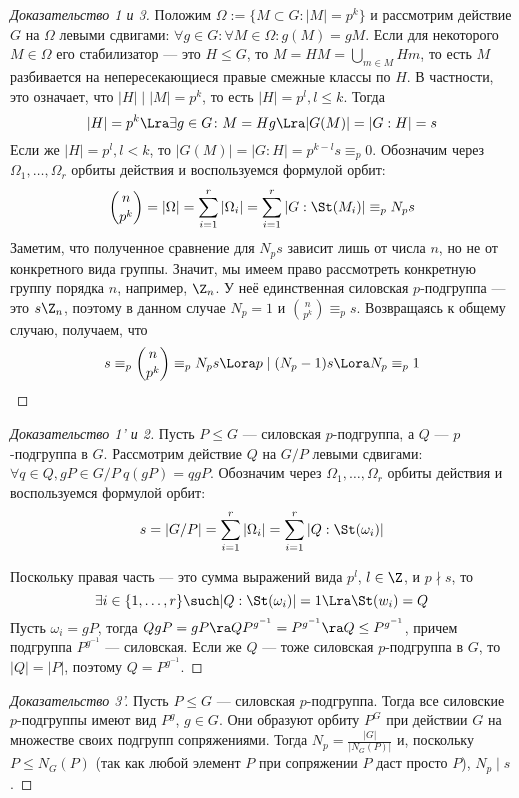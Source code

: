 \begin{proof}[Доказательство 1 и 3]
	Положим $\Omega := \{M  \subset G: |M| = p^k\}$ и рассмотрим действие $G$ на $\Omega$ левыми сдвигами: $\forall g \in G: \forall M \in \Omega: g(M) = gM$. Если для некоторого $M \in \Omega$ его стабилизатор --- это $H \le G$, то $M = HM = \bigcup_{m \in M}Hm$, то есть $M$ разбивается на непересекающиеся правые смежные классы по $H$. В частности, это означает, что $|H| \mid |M| = p^k$, то есть $|H| = p^l, l \le k$. Тогда 
	\[
		|H| = p^k \Lra \exists g \in G \colon M = Hg \Lra |G(M)| = |G : H| = s
	\]
	Если же $|H| = p^l, l < k$, то $|G(M)| = |G : H| = p^{k-l}s \equiv_p 0$. Обозначим через $\Omega_1, \ldots, \Omega_r$ орбиты действия и воспользуемся формулой орбит:
	\[
		\binom{n}{p^k} = |\Omega| = \sum\limits_{i = 1}^r|\Omega_i| = \sum\limits_{i = 1}^r|G : \St(M_i)| \equiv_p N_ps
	\]
	Заметим, что полученное сравнение для $N_ps$ зависит лишь от числа $n$, но не от конкретного вида группы. Значит, мы имеем право рассмотреть конкретную группу порядка $n$, например, $\Z_n$. У неё единственная силовская $p$-подгруппа --- это $s\Z_n$, поэтому в данном случае $N_p = 1$ и $\binom{n}{p^k} \equiv_p s$. Возвращаясь к общему случаю, получаем, что
	\[
		s \equiv_p \binom{n}{p^k} \equiv_p N_ps \Lora p \mid (N_p - 1)s \Lora N_p \equiv_p 1
	\]
\end{proof}

\begin{proof}[Доказательство 1' и 2]
	Пусть $P \le G$ --- силовская $p$-подгруппа, а $Q$ --- $p$-подгруппа в $G$. Рассмотрим действие $Q$ на $G / P$ левыми сдвигами: $\forall q \in Q, gP \in G / P\ q(gP) = qgP$. Обозначим через $\Omega_1, \ldots, \Omega_r$ орбиты действия и воспользуемся формулой орбит:
	\[s = |G / P| = \sum\limits_{i = 1}^r |\Omega_i| = \sum_{i = 1}^r |Q : \St(\omega_i)|\]
	
	Поскольку правая часть --- это сумма выражений вида $p^l$, $l \in \Z$, и $p \nmid s$, то
	\[
		\exists i \in \{1, \ldots, r\} \such |Q : \St(\omega_i)| = 1 \Lra \St(w_i) = Q
	\]
	Пусть $\omega_i = gP$, тогда $QgP = gP \ra QP^{g^{-1}} = P^{g^{-1}} \ra Q \le P^{g^{-1}}$, причем подгруппа $P^{g^{-1}}$ --- силовская. Если же $Q$ --- тоже силовская $p$-подгруппа в $G$, то $|Q| = |P|$, поэтому $Q = P^{g^{-1}}$.
\end{proof}

\begin{proof}[Доказательство 3']
	Пусть $P \le G$ --- силовская $p$-подгруппа. Тогда все силовские $p$-подгруппы имеют вид $P^g$, $g \in G$. Они образуют орбиту $P^G$ при действии $G$ на множестве своих подгрупп сопряжениями. Тогда $N_p = \frac{|G|}{|N_G(P)|}$ и, поскольку $P \le N_G(P)$ (так как любой элемент $P$ при сопряжении $P$ даст просто $P$), $N_p \mid s$.
\end{proof}

